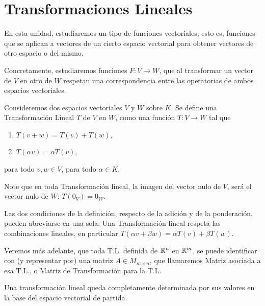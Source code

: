 






























\section{Transformaciones Lineales}
En esta unidad, estudiaremos un tipo de funciones vectoriales; esto es, funciones que se aplican a vectores de un cierto espacio vectorial para obtener vectores de otro espacio o del mismo.

Concretamente, estudiaremos funciones $F: V\to W$, que al transformar un vector de $V$ en otro de $W$ respetan una correspondencia entre las operatorias de ambos espacios vectoriales.

\begin{defin}
Consideremos dos espacios vectoriales $V$ y $W$ sobre $K$. Se define una
Transformación Lineal $T$ de $ V$ en $W$, como una función $T:V\to W$ tal que
\begin{enumerate}
    \item $T(v+w)=T(v)+T(w)$,
    \item $T(\alpha v)=\alpha T(v)$,
\end{enumerate}
para todo $v,w\in V$, para todo $\alpha \in K$.
\end{defin}

Note que en toda Transformaci\'on lineal, la imagen del vector nulo de $V$, será el vector nulo de $W$: $T(0_V)=0_W$.

Las dos condiciones de la definición, respecto de la adición y de la ponderación,
pueden abreviarse en una sola: Una Transformaci\'on lineal respeta las combinaciones lineales, en particular $T(\alpha v+\beta w)=\alpha T(v)+\beta T(w)$.


Veremos más adelante, que toda T.L. definida de $\mathbb{R}^n$ en $\mathbb{R}^m$, se puede
identificar con (y representar por) una matriz $A\in M_{m\times n}$, que llamaremos Matriz asociada a esa T.L., o Matriz de Transformación para la T.L.

Una transformaci\'on lineal queda completamente determinada por sus valores en la base del espacio vectorial de partida.


